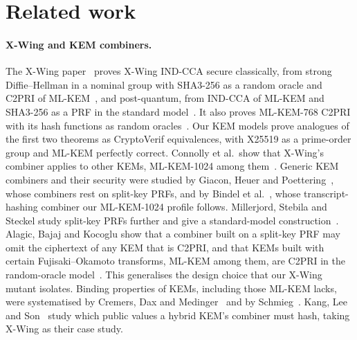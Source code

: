 \section{Related work}\label{sec:related}

\paragraph{X-Wing and KEM combiners.} The X-Wing paper~\cite{XWing} proves
X-Wing IND-CCA secure classically, from strong Diffie--Hellman in a nominal
group with SHA3-256 as a random oracle and C2PRI of
ML-KEM~\cite[Thm.~1]{XWing}, and post-quantum, from IND-CCA of ML-KEM and
SHA3-256 as a PRF in the standard model~\cite[Thm.~2]{XWing}. It also
proves ML-KEM-768 C2PRI with its hash functions as random
oracles~\cite[Thm.~3]{XWing}. Our KEM models prove analogues of the first
two theorems as CryptoVerif equivalences, with X25519 as a prime-order group
and ML-KEM perfectly correct. Connolly et al.\ show that X-Wing's combiner applies
to other KEMs, ML-KEM-1024 among them~\cite{Starfighters}. Generic KEM
combiners and their security were studied by Giacon, Heuer and
Poettering~\cite{GHP18}, whose combiners rest on split-key PRFs, and by
Bindel et al.~\cite{BBFGS19}, whose transcript-hashing combiner our
ML-KEM-1024 profile follows. Millerjord, Stebila and Steckel study split-key
PRFs further and give a standard-model construction~\cite{MSS26}. Alagic,
Bajaj and Kocoglu show that a combiner built on a split-key PRF may omit the
ciphertext of any KEM that is C2PRI, and that KEMs built with certain
Fujisaki--Okamoto transforms, ML-KEM among them, are C2PRI in the
random-oracle model~\cite{ABK25}. This generalises the design choice that
our X-Wing mutant isolates. Binding
properties of KEMs, including those ML-KEM lacks, were systematised by
Cremers, Dax and Medinger~\cite{CDM24} and by Schmieg~\cite{Sch24}. Kang,
Lee and Son~\cite{KLS26} study which public values a hybrid KEM's combiner
must hash, taking X-Wing as their case study.

